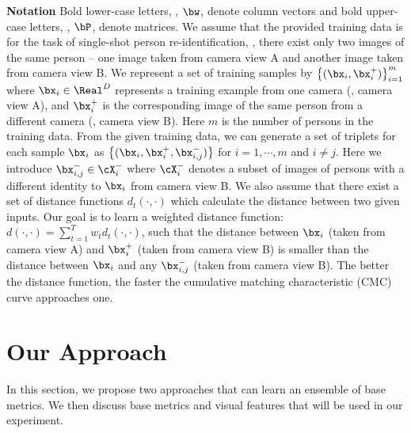 \documentclass[10pt,twocolumn,letterpaper]{article}
\def\bxi{{\bx_i}}
\def\bxip{{\bx_i^{+}}}
\def\bxijm{{\bx_{i,j}^{-}}}
\renewcommand{\paragraph}{\textbf}
\begin{document}
\paragraph{Notation}
Bold lower-case letters, \eg, $\bw$, denote column vectors and
bold upper-case letters, \eg, $\bP$, denote matrices.
We assume that the provided training data is
for the task of single-shot person re-identification,
\ie, there exist only two images of the same person --
one image taken from camera view A and another image taken from camera view B.
We represent a set of training samples by $\left\{ (\bxi, \bxip) \right\}_{i=1}^m$
where $\bx_i \in {\Real}^D$ represents
a training example from one camera (\ie, camera view A),
and $\bxip$ is the corresponding image of the same person
from a different camera (\ie, camera view B).
Here $m$ is the number of persons in the training data.
From the given training data, we can generate
a set of triplets for each sample $\bxi$ as
$\left\{(\bxi, \bxip, \bxijm) \right\}$
for $i = 1,\cdots,m$ and $i \neq j$.
Here we introduce $\bxijm \in \cX_i^{-}$ where $\cX_i^{-}$ denotes
a subset of images of persons with a different identity to $\bxi$
from camera view B.
%
We also assume that there exist a set of distance functions
$d_t(\cdot,\cdot)$ which calculate the distance between
two given inputs.
Our goal is to learn a weighted distance function:
$d(\cdot,\cdot) = \sum_{t=1}^T w_t d_t(\cdot,\cdot)$,
such that
the distance between $\bxi$ (taken from camera view A) and $\bxip$
(taken from camera view B)
is smaller than the distance between
$\bxi$ and any $\bxijm$ (taken from camera view B).
%
%
%
The better the distance function, the faster the
cumulative matching characteristic (CMC)
curve approaches one.


%

\section{Our Approach}
%
In this section, we propose two approaches that can learn
an ensemble of base metrics.
We then discuss base metrics and visual features
that will be used in our experiment.
%
%
%
%
%
%
%
%

%
\end{document}
